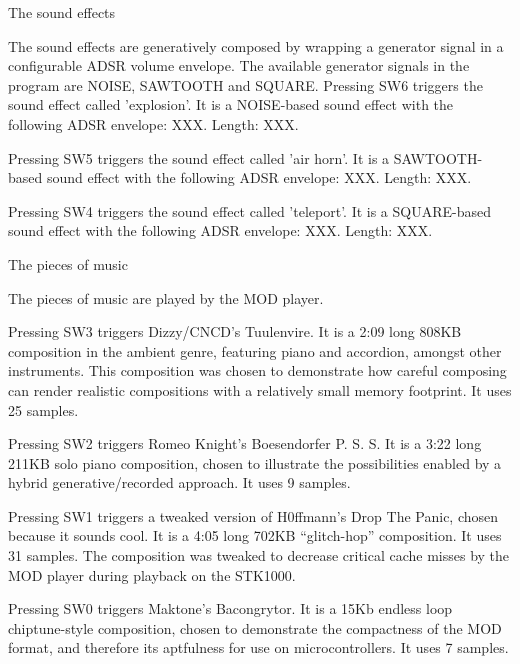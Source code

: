 The sound effects

The sound effects are generatively composed by wrapping a generator signal in a configurable ADSR volume envelope.
The available generator signals in the program are NOISE, SAWTOOTH and SQUARE.
Pressing SW6 triggers the sound effect called 'explosion'.
It is a NOISE-based sound effect with the following ADSR envelope: XXX.
Length: XXX.

Pressing SW5 triggers the sound effect called 'air horn'.
It is a SAWTOOTH-based sound effect with the following ADSR envelope: XXX.
Length: XXX.

Pressing SW4 triggers the sound effect called 'teleport'.
It is a SQUARE-based sound effect with the following ADSR envelope: XXX.
Length: XXX.


The pieces of music

The pieces of music are played by the MOD player.

Pressing SW3 triggers Dizzy/CNCD's Tuulenvire.
It is a 2:09 long 808KB composition in the ambient genre, featuring piano and accordion, amongst other instruments.
This composition was chosen to demonstrate how careful composing can render realistic compositions with a relatively small memory footprint.
It uses 25 samples.

Pressing SW2 triggers Romeo Knight's Boesendorfer P. S. S.
It is a 3:22 long 211KB solo piano composition, chosen to illustrate the possibilities enabled by a hybrid generative/recorded approach.
It uses 9 samples.

Pressing SW1 triggers a tweaked version of H0ffmann's Drop The Panic, chosen because it sounds cool.
It is a 4:05 long 702KB ``glitch-hop'' composition.
It uses 31 samples.
The composition was tweaked to decrease critical cache misses by the MOD player during playback on the STK1000.

Pressing SW0 triggers Maktone's Bacongrytor.
It is a 15Kb endless loop chiptune-style composition, chosen to demonstrate the compactness of the MOD format, and therefore its aptfulness for use on microcontrollers.
It uses 7 samples.
